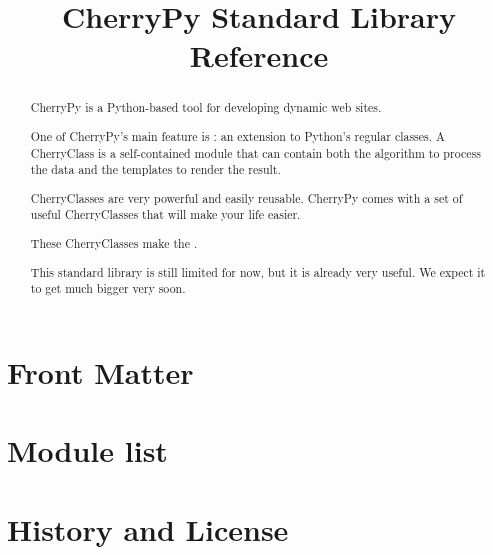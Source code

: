 \documentclass{manual}
\title{CherryPy Standard Library Reference}
\begin{document}
\maketitle

\ifhtml
\chapter*{Front Matter\label{front}}
\fi



\begin{abstract}

\noindent
CherryPy is a Python-based tool for developing dynamic web sites.

One of CherryPy's main feature is : an extension
to Python's regular classes. A CherryClass is a self-contained module that can contain
both the algorithm to process the data and the templates to render the result.

CherryClasses are very powerful and easily reusable. CherryPy comes with a set of
useful CherryClasses that will make your life easier.

These CherryClasses make the .

This standard library is still limited for now, but it is already very useful.
We expect it to get much bigger very soon.
\end{abstract}

\tableofcontents

\chapter{Module list}









\appendix

\chapter{History and License}



\end{document}
